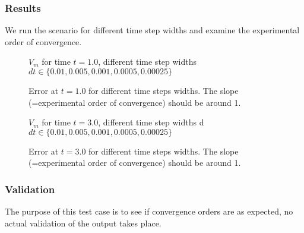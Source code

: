 \subsubsection{Results}
We run the scenario for different time step widths and examine the experimental order of convergence.
%
%
%
%
\begin{figure}[h!]
    \centering 
    \caption{$V_m$ for time $t=1.0$, different time step widths ${dt \in \{0.01, 0.005, 0.001, 0.0005, 0.00025\}}$}
    \label{example-0404-c-vm-1.0}
\end{figure}
%
\begin{figure}[h!]
    \centering 
    \caption{Error at $t=1.0$ for different time steps widths. The slope (=experimental order of convergence) should be around 1.}
    \label{example-0404-c-error-1.0}
\end{figure}
\begin{figure}[h!]
    \centering 
    \caption{$V_m$ for time $t=3.0$, different time step widths d${dt \in \{0.01, 0.005, 0.001, 0.0005, 0.00025\}}$}
    \label{example-0404-c-vm-3.0}
\end{figure}
%
\begin{figure}[h!]
    \centering 
    \caption{Error at $t=3.0$ for different time steps widths. The slope (=experimental order of convergence) should be around 1.}
    \label{example-0404-c-error-3.0}
\end{figure}
%
%
%
\subsubsection{Validation}
%
The purpose of this test case is to see if convergence orders are as expected, no actual validation of the output takes place.
%
